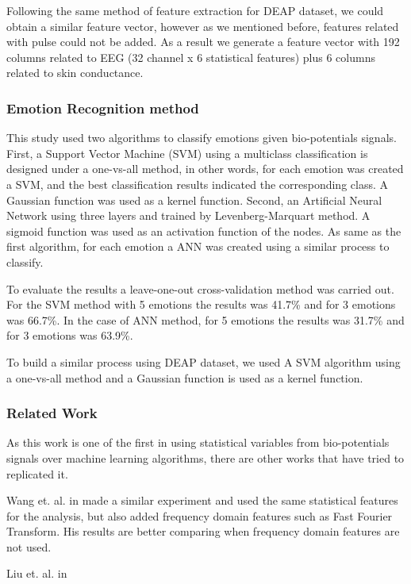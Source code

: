 \documentclass{sig-alternate}
\begin{document}
Following the same method of feature extraction for DEAP dataset, 
we could obtain a similar feature vector, however as we mentioned before, 
features related with pulse could not be added. As a result we generate 
a feature vector with 192 columns related to EEG (32 channel x 6 statistical 
features) plus 6 columns related to skin conductance.

\subsubsection{Emotion Recognition method}

This study used two algorithms to classify emotions given bio-potentials signals.
First, a Support Vector Machine (SVM) using a multiclass classification is designed under 
a one-vs-all method, in other words, for each emotion was created a SVM, and the best
classification results indicated the corresponding class. A Gaussian function was used as a kernel function.
Second, an Artificial Neural Network using three layers and trained by Levenberg-Marquart method.
A sigmoid function was used as an activation function of the nodes. As same as the first algorithm,
for each emotion a ANN was created using a similar process to classify.

To evaluate the results a leave-one-out cross-validation method was carried out. 
For the SVM method with 5 emotions the results was 41.7\% and for 3 emotions was 66.7\%.
In the case of ANN method, for 5 emotions the results was 31.7\% and for 3 emotions was
63.9\%.   

To build a similar process using DEAP dataset, we used A SVM algorithm using a
one-vs-all method and a Gaussian function is used as a kernel function. 

\subsubsection{Related Work}

As this work is one of the first in using statistical variables from 
bio-potentials signals over machine learning algorithms, there are other works
that have tried to replicated it. 

Wang et. al. in \cite{wang2011} made a similar experiment
and used the same statistical features for the analysis, but also 
added frequency domain features such as Fast Fourier Transform. His
results are better comparing when frequency domain features are not used.

Liu et. al. in \cite{liu2013}
\end{document}
